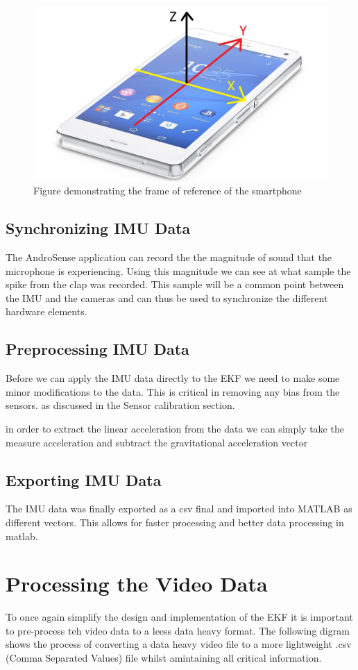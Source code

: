 \begin{figure}[!ht] 
\captionsetup{width=0.5\linewidth, font=small}  
\includegraphics[width=0.5\linewidth]{figures/phone.jpg}
\caption{Figure demonstrating the frame of reference of the smartphone}
\label{fig:phone}
\end{figure}

\subsection{Synchronizing IMU Data}
The AndroSense application can record the the magnitude of sound that the microphone is experiencing. Using this magnitude we can see at what sample the spike from the clap was recorded. This sample will be a common point between the IMU and the cameras and can thus be used to synchronize the different hardware elements.

\subsection{Preprocessing IMU Data}
Before we can apply the IMU data directly to the EKF we need to make some minor modifications to the data. This is critical in removing any bias from the sensors. as discussed in the Sensor calibration section.

in order to extract the linear acceleration from the data we can simply take the measure acceleration and subtract the gravitational acceleration vector

\subsection{Exporting IMU Data}
The IMU data was finally exported as a csv final and imported into MATLAB as different vectors. This allows for faster processing and better data processing in matlab.





\section{Processing the Video Data}
To once again simplify the design and implementation of the EKF it is important to pre-process teh video data to a leess data heavy format. The following digram shows the process of converting a data heavy video file to a more lightweight .csv (Comma Separated Values) file whilst amintaining all critical information.

